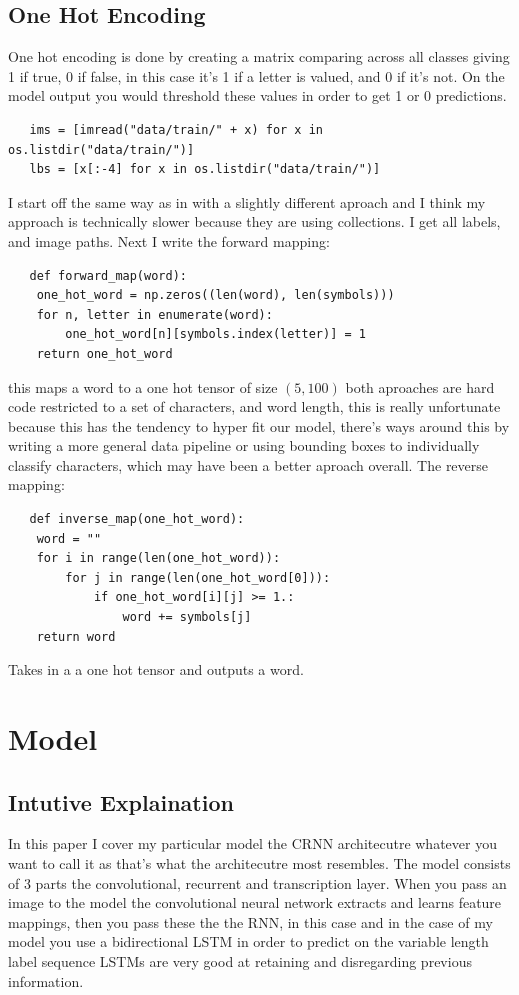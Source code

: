 \documentclass[11pt]{article}
\begin{document}
\subsection{One Hot Encoding}
One hot encoding is done by creating a matrix comparing across all classes giving 1 if true, 0 if false, in this case it's 1 if a letter is valued, and 0 if it's not. On the model output you would threshold these values in order to get 1 or 0 predictions.
\begin{verbatim}
   ims = [imread("data/train/" + x) for x in os.listdir("data/train/")]
   lbs = [x[:-4] for x in os.listdir("data/train/")]
\end{verbatim}
I start off the same way as in \cite{a2019} with a slightly different aproach and I think my approach is technically slower because they are using collections. I get all labels, and image paths. Next I write the forward mapping:
\begin{verbatim}
   def forward_map(word):
    one_hot_word = np.zeros((len(word), len(symbols)))
    for n, letter in enumerate(word):
        one_hot_word[n][symbols.index(letter)] = 1
    return one_hot_word
\end{verbatim}
this maps a word to a one hot tensor of size $(5, 100)$ both aproaches are hard code restricted to a set of characters, and word length, this is really unfortunate because this has the tendency to hyper fit our model, there's ways around this by writing a more general data pipeline or using bounding boxes to individually classify characters, which may have been a better aproach overall. The reverse mapping:
\begin{verbatim}
   def inverse_map(one_hot_word):
    word = ""
    for i in range(len(one_hot_word)):
        for j in range(len(one_hot_word[0])):
            if one_hot_word[i][j] >= 1.:
                word += symbols[j]
    return word
\end{verbatim}
Takes in a a one hot tensor and outputs a word.

\section{Model}
\subsection{Intutive Explaination}
In this paper I cover my particular model the CRNN architecutre whatever you want to call it as that's what the architecutre most resembles. The model consists of 3 parts the convolutional, recurrent and transcription layer. When you pass an image to the model the convolutional neural network extracts and learns feature mappings, then you pass these the the RNN, in this case and in the case of my model you use a bidirectional LSTM in order to predict on the variable length label sequence LSTMs are very good at retaining and disregarding previous information. \cite{feng2019} 
\end{document}
